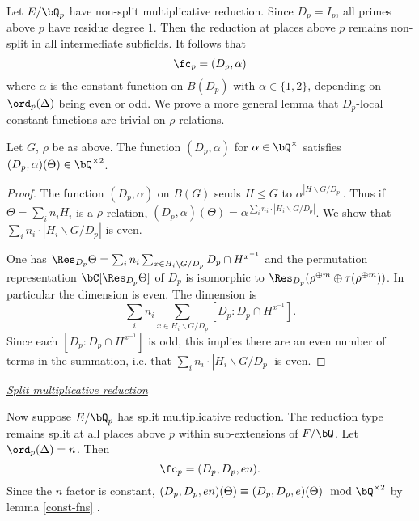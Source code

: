 Let $E / \bQ_p$ have non-split multiplicative reduction. Since $D_p = I_p$, all primes above $p$ have residue degree $1$. Then the reduction at places above $p$ remains non-split in all intermediate subfields.
It follows that 
\[ \fc_p = (D_p, \alpha) \]
where $\alpha$ is the constant function on $B(D_p)$ with $\alpha \in \{1, 2\}$, depending on $\ord_p(\Delta)$ being even or odd. 
We prove a more general lemma that $D_p$-local constant functions are trivial on $\rho$-relations.

\begin{lemma}\label{const-fns}
Let $G$, $\rho$ be as above. The function $(D_p, \alpha)$ for $\alpha \in \bQ^{\times}$ satisfies $(D_p, \alpha)(\Theta) \in \bQ^{\times 2}$.  
\end{lemma}   

\begin{proof}
    The function $(D_p, \alpha)$ on $B(G)$ sends $H \leq G$ to $\alpha^{| H \backslash G / D_p|}$. Thus if $\Theta = \sum_i n_i H_i$ is a $\rho$-relation, $(D_p, \alpha)(\Theta) = \alpha^{ \sum_i n_i \cdot | H_i \backslash G / D_p|}$. We show that $\sum_i n_i \cdot | H_i \backslash G / D_p|$ is even. 

    One has $\Res_{D_p} \Theta = \sum_i n_i \sum_{x \in H_i \backslash G / D_p} D_p \cap H^{x^{-1}}$ and the permutation representation $\bC[\Res_{D_p} \Theta]$ of $D_p$ is isomorphic to $\Res_{D_p} (\rho^{\oplus m} \oplus \tau(\rho^{\oplus m}))$. In particular the dimension is even. The dimension is $$\sum_i n_i \sum_{x \in H_i \backslash G / D_p} [D_p \colon D_p \cap H^{x^{-1}} ].$$ Since each $[D_p \colon D_p \cap H^{x^{-1}} ]$ is odd, this implies there are an even number of terms in the summation, i.e. that $\sum_i n_i \cdot | H_i \backslash G / D_p|$ is even. 
    
\end{proof}

\noindent\underline{\textit{Split multiplicative reduction}}

Now suppose $E / \bQ_p$ has split multiplicative reduction. The reduction type remains split at all places above $p$ within sub-extensions of $F / \bQ$. Let $\ord_p(\Delta) = n$. Then 
\[ \fc_p = (D_p, D_p, en). \]
Since the $n$ factor is constant, $(D_p, D_p, en)(\Theta) \equiv (D_p, D_p, e)(\Theta) \mod \bQ^{\times 2}$ by lemma \ref{const-fns} .

